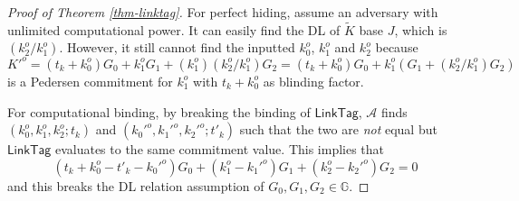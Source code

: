 \documentclass{article}
\theoremstyle{plain}
\theoremstyle{remark}
\begin{document}
\begin{proof}[Proof of Theorem \ref{thm-linktag}]
For perfect hiding, assume an adversary with unlimited computational power. It can easily find the DL of $\tilde{K}$ base $J$, which is $(k_2^o/k_1^o)$. However, it still cannot find the inputted $k_0^o$, $k_1^o$ and $k_2^o$ because $K'^o = (t_k + k_0^o) G_0 + k_1^o G_1 + (k_1^o) (k_2^o/k_1^o) G_2 = (t_k + k_0^o) G_0 + k_1^o (G_1 + (k_2^o/k_1^o) G_2)$ is a Pedersen commitment for $k_1^o$ with $t_k + k_0^o$ as blinding factor.

For computational binding, by breaking the binding of $\textsf{LinkTag}$, $\mathcal{A}$ finds $(k_0^o, k_1^o, k_2^o; t_k)$ and $(k_0'^o, k_1'^o, k_2'^o; t'_k)$ such that the two are \textit{not} equal but $\textsf{LinkTag}$ evaluates to the same commitment value. This implies that
$$(t_k + k_0^o - t'_k - k_0'^o) G_0 + (k_1^o - k_1'^o) G_1 + (k_2^o - k_2'^o) G_2 = 0$$
and this breaks the DL relation assumption of $G_0, G_1, G_2 \in \mathbb{G}$.
\end{proof}
\end{document}
